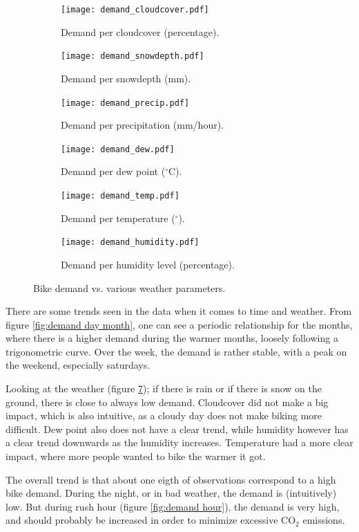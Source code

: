 \begin{figure}[htbp]
    \centering

    \begin{subfigure}{0.30\textwidth}
        \centering
        \texttt{[image: demand\_cloudcover.pdf]}
        \caption{Demand per cloudcover (percentage).}
        \label{fig:demand cloudcover}
    \end{subfigure}
    \hfill
    \begin{subfigure}{0.30\textwidth}
        \centering
        \texttt{[image: demand\_snowdepth.pdf]}
        \caption{Demand per snowdepth (mm).}
        \label{fig:demand snowdepth}
    \end{subfigure}
    \hfill
    \begin{subfigure}{0.30\textwidth}
        \centering
        \texttt{[image: demand\_precip.pdf]}
        \caption{Demand per precipitation (mm/hour).}
        \label{fig:demand precip}
    \end{subfigure}
    \hfill
    \begin{subfigure}{0.30\textwidth}
        \centering
        \texttt{[image: demand\_dew.pdf]}
        \caption{Demand per dew point ($^\circ$C).}
        \label{fig:demand dew}
    \end{subfigure}
    \hfill
    \begin{subfigure}{0.30\textwidth}
        \centering
        \texttt{[image: demand\_temp.pdf]}
        \caption{Demand per temperature ($^\circ$).}
        \label{fig:demand temp}
    \end{subfigure}
    \hfill
    \begin{subfigure}{0.30\textwidth}
        \centering
        \texttt{[image: demand\_humidity.pdf]}
        \caption{Demand per humidity level (percentage).} 
        \label{fig:demand humidity}
    \end{subfigure}
        \caption{Bike demand vs. various weather parameters.}
        \label{fig:demand weather}
\end{figure}
There are some trends seen in the data when it comes to time and weather. From figure \ref{fig:demand day month}, one can see a periodic relationship for the months, where there is a higher demand during the warmer months, loosely following a trigonometric curve. Over the week, the demand is rather stable, with a peak on the weekend, especially saturdays. 

Looking at the weather (figure \ref{fig:demand weather}); if there is rain or if there is snow on the ground, there is close to always low demand. Cloudcover did not make a big impact, which is also intuitive, as a cloudy day does not make biking more difficult. Dew point also does not have a clear trend, while humidity however has a clear trend downwards as the humidity increases. Temperature had a more clear impact, where more people wanted to bike the warmer it got.

The overall trend is that about one eigth of observations correspond to a high bike demand. During the night, or in bad weather, the demand is (intuitively) low. But during rush hour (figure \ref{fig:demand hour}), the demand is very high, and should probably be increased in order to minimize excessive CO$_2$ emissions.